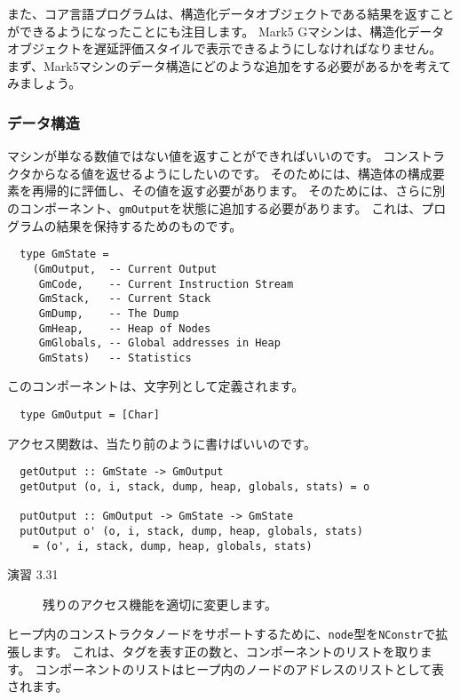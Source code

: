 \documentclass{jarticle}
\begin{document}
また、コア言語プログラムは、構造化データオブジェクトである結果を返すことができるようになったことにも注目します。
Mark5 Gマシンは、構造化データオブジェクトを遅延評価スタイルで表示できるようにしなければなりません。
まず、Mark5マシンのデータ構造にどのような追加をする必要があるかを考えてみましょう。

\subsubsection{データ構造}

マシンが単なる数値ではない値を返すことができればいいのです。
コンストラクタからなる値を返せるようにしたいのです。
そのためには、構造体の構成要素を再帰的に評価し、その値を返す必要があります。
そのためには、さらに別のコンポーネント、\texttt{gmOutput}を状態に追加する必要があります。
これは、プログラムの結果を保持するためのものです。

\begin{verbatim}
  type GmState =
    (GmOutput,  -- Current Output
     GmCode,    -- Current Instruction Stream
     GmStack,   -- Current Stack
     GmDump,    -- The Dump
     GmHeap,    -- Heap of Nodes
     GmGlobals, -- Global addresses in Heap
     GmStats)   -- Statistics
\end{verbatim}

このコンポーネントは、文字列として定義されます。

\begin{verbatim}
  type GmOutput = [Char]
\end{verbatim}

アクセス関数は、当たり前のように書けばいいのです。

\begin{verbatim}
  getOutput :: GmState -> GmOutput
  getOutput (o, i, stack, dump, heap, globals, stats) = o

  putOutput :: GmOutput -> GmState -> GmState
  putOutput o' (o, i, stack, dump, heap, globals, stats)
    = (o', i, stack, dump, heap, globals, stats)
\end{verbatim}

\begin{description}
	\item[演習 3.31] 残りのアクセス機能を適切に変更します。
\end{description}

ヒープ内のコンストラクタノードをサポートするために、\texttt{node}型を\texttt{NConstr}で拡張します。
これは、タグを表す正の数と、コンポーネントのリストを取ります。
コンポーネントのリストはヒープ内のノードのアドレスのリストとして表されます。
\end{document}
